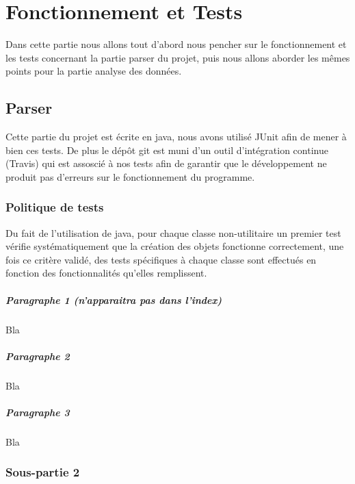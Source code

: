 \chapter{Fonctionnement et Tests}

Dans cette partie nous allons tout d'abord nous pencher sur le fonctionnement et les tests concernant la partie parser du projet, puis nous allons aborder les mêmes points pour la partie analyse des données.

\section{Parser}

Cette partie du projet est écrite en java, nous avons utilisé JUnit afin de mener à bien ces tests. De plus le dépôt git est muni d'un outil d'intégration continue (Travis) qui est assoscié à nos tests afin de garantir que le développement ne produit pas d'erreurs sur le fonctionnement du programme.

\subsection{Politique de tests}

Du fait de l'utilisation de java, pour chaque classe non-utilitaire un premier test vérifie systématiquement que la création des objets fonctionne correctement, une fois ce critère validé, des tests spécifiques à chaque classe sont effectués en fonction des fonctionnalités qu'elles remplissent.



\paragraph*{Paragraphe 1 (n'apparaitra pas dans l'index)} Bla

\paragraph*{Paragraphe 2} Bla

\paragraph*{Paragraphe 3} Bla

\subsection{Sous-partie 2}

